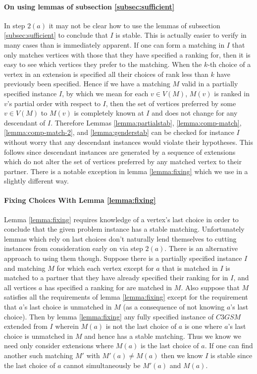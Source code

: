 \paragraph{On using lemmas of subsection \ref{subsec:sufficient}}
In step $2(a)$ it may not be clear how to use the lemmas of subsection \ref{subsec:sufficient} to conclude that $I$ is stable. This is actually easier to verify in many cases than is immediately apparent. If one can form a matching in $I$ that only matches vertices with those that they have specified a ranking for, then it is easy to see which vertices they prefer to the matching. When the $k$-th choice of a vertex in an extension is specified all their choices of rank less than $k$ have previously been specified. Hence if we have a matching $M$ valid in a partially specified instance $I$, by which we mean for each $v \in V(M)$, $M(v)$ is ranked in $v$'s partial order with respect to $I$, then the set of vertices preferred by some $v \in V(M)$ to $M(v)$ is completely known at $I$ and does not change for any descendant of $I$. Therefore Lemmas \ref{lemma:partialstab}, \ref{lemma:comp-match}, \ref{lemma:comp-match-2}, and \ref{lemma:genderstab} can be checked for instance $I$ without worry that any descendant instances would violate their hypotheses. This follows since descendant instances are generated by a sequence of extensions which do not alter the set of vertices preferred by any matched vertex to their partner. There is a notable exception in lemma \ref{lemma:fixing} which we use in a slightly different way.
\paragraph{Fixing Choices With Lemma \ref{lemma:fixing}}
Lemma \ref{lemma:fixing} requires knowledge of a vertex's last choice in order to conclude that the given problem instance has a stable matching. Unfortunately lemmas which rely on last choices don't naturally lend themselves to cutting instances from consideration early on via step $2(a)$. There is an alternative approach to using them though. Suppose there is a partially specified instance $I$ and matching $M$ for which each vertex except for $a$ that is matched in $I$ is matched to a partner that they have already specified their ranking for in $I$, and all vertices $a$ has specified a ranking for are matched in $M$. Also suppose that $M$ satisfies all the requirements of lemma \ref{lemma:fixing} except for the requirement that $a$'s last choice is unmatched in $M$ (as a consequence of not knowing $a$'s last choice). Then by lemma \ref{lemma:fixing} any fully specified instance of $C3GSM$ extended from $I$ wherein $M(a)$ is not the last choice of $a$ is one where $a$'s last choice is unmatched in $M$ and hence has a stable matching. Thus we know we need only consider extensions where $M(a)$ is the last choice of $a$. If one can find another such matching $M'$ with $M'(a) \neq M(a)$ then we know $I$ is stable since the last choice of $a$ cannot simultaneously be $M'(a)$ and $M(a)$.
